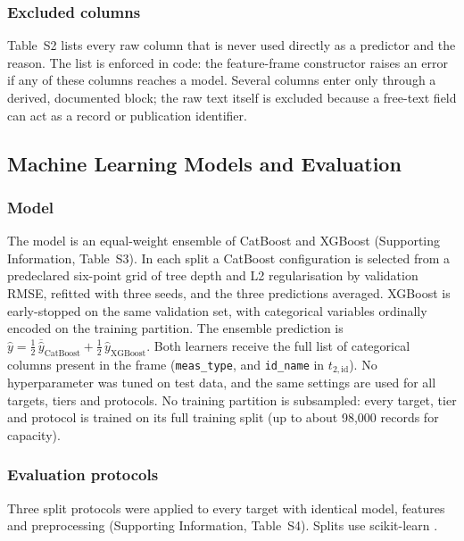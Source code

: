 \documentclass[journal=jcisd8,manuscript=article,layout=traditional]{achemso}
\begin{document}
\subsubsection{Excluded columns}
\label{sec:forbidden}

Table~S2 lists every raw column that is never used directly as a predictor and the reason. The list is enforced in code: the feature-frame constructor raises an error if any of these columns reaches a model. Several columns enter only through a derived, documented block; the raw text itself is excluded because a free-text field can act as a record or publication identifier.



\subsection{Machine Learning Models and Evaluation}

\subsubsection{Model}
\label{sec:models}

The model is an equal-weight ensemble of CatBoost \cite{prokhorenkova2018catboost} and XGBoost \cite{chen2016xgboost} (Supporting Information, Table~S3). In each split a CatBoost configuration is selected from a predeclared six-point grid of tree depth and L2 regularisation by validation RMSE, refitted with three seeds, and the three predictions averaged. XGBoost is early-stopped on the same validation set, with categorical variables ordinally encoded on the training partition. The ensemble prediction is $\hat y = \tfrac12\,\overline{\hat y}_{\mathrm{CatBoost}} + \tfrac12\,\hat y_{\mathrm{XGBoost}}$. Both learners receive the full list of categorical columns present in the frame (\texttt{meas\_type}, and \texttt{id\_name} in $t_{2,\mathrm{id}}$). No hyperparameter was tuned on test data, and the same settings are used for all targets, tiers and protocols. No training partition is subsampled: every target, tier and protocol is trained on its full training split (up to about 98,000 records for capacity).



\subsubsection{Evaluation protocols}
\label{sec:protocols}

Three split protocols were applied to every target with identical model, features and preprocessing (Supporting Information, Table~S4). Splits use scikit-learn \cite{pedregosa2011sklearn}.
\end{document}
